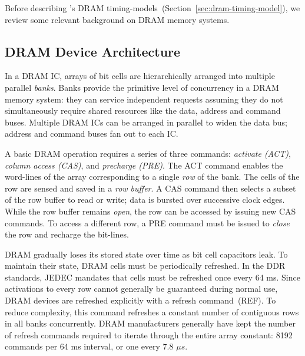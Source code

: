 Before describing \PNAME's DRAM timing-models~(Section~\ref{sec:dram-timing-model}), we review some relevant background
on DRAM memory systems.

\subsection{DRAM Device Architecture}\label{sec:dram-arch}
In a DRAM IC, arrays of bit cells are hierarchically arranged into multiple
parallel \textit{banks}. Banks provide the primitive level of concurrency in a
DRAM memory system: they can service independent requests assuming they do not
simultaneously require shared resources like the data, address and command
buses.  Multiple DRAM ICs can be arranged in parallel to widen the data bus;
address and command buses fan out to each IC.

A basic DRAM operation requires a series of three commands: \textit{activate (ACT)},
\textit{column access (CAS)}, and \textit{precharge (PRE)}. The ACT command
enables the word-lines of the array corresponding to a single \textit{row} of
the bank. The cells of the row are sensed and saved in a \textit{row
buffer}. A CAS command then selects a subset of the row buffer to
read or write; data is bursted over successive clock edges. While the row
buffer remains \textit{open}, the row can be accessed by issuing new CAS
commands. To access a different row, a PRE command must be
issued to \textit{close} the row and recharge the bit-lines.


DRAM gradually loses its stored state over time as bit cell capacitors leak. To
maintain their state, DRAM cells must be periodically refreshed. In the DDR
standards, JEDEC mandates that cells must be refreshed once every 64
ms. Since activations to every row cannot generally be guaranteed during normal
use, DRAM devices are refreshed explicitly with a refresh command~(REF). To
reduce complexity, this command refreshes a constant number of contiguous rows
in all banks concurrently. DRAM manufacturers generally have kept the number of
refresh commands required to iterate through the entire array constant: 8192
commands per 64 ms interval, or one every 7.8 $\mu s$.
